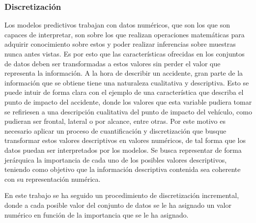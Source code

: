 \documentclass{uathesis-es}
\begin{document}
\subsubsection{Discretización}

Los modelos predictivos trabajan con datos numéricos, que son los que son capaces de interpretar, son sobre los que realizan operaciones matemáticas para adquirir conocimiento sobre estos y poder realizar inferencias sobre muestras nunca antes vistas. Es por esto que las características ofrecidas en los conjuntos de datos deben ser transformadas a estos valores sin perder el valor que representa la información. A la hora de describir un accidente, gran parte de la información que se obtiene tiene una naturaleza cualitativa y descriptiva. Esto se puede intuir de forma clara con el ejemplo de una característica que describa el punto de impacto del accidente, donde los valores que esta variable pudiera tomar se refiriesen a una descripción cualitativa del punto de impacto del vehículo, como pudieran ser frontal, lateral o por alcance, entre otras. Por este motivo es necesario aplicar un proceso de cuantificación y discretización que busque transformar estos valores descriptivos en valores numéricos, de tal forma que los datos puedan ser interpretados por los modelos. Se busca representar de forma jerárquica la importancia de cada uno de los posibles valores descriptivos, teniendo como objetivo que la información descriptiva contenida sea coherente con su representación numérica.


En este trabajo se ha seguido un procedimiento de discretización incremental, donde a cada posible valor del conjunto de datos se le ha asignado un valor numérico en función de la importancia que se le ha asignado.

\end{document}
